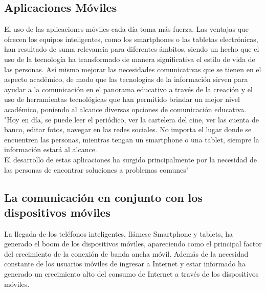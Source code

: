 	\subsection{Aplicaciones Móviles}
	
	El uso de las aplicaciones móviles cada día toma más fuerza. Las ventajas que ofrecen los equipos inteligentes, como los smartphones o las tabletas electrónicas, han resultado de suma relevancia para diferentes ámbitos, siendo un hecho que el uso de la tecnología ha transformado de manera significativa el estilo de vida de las personas. 
	Así mismo mejorar las necesidades comunicativas que se tienen en el aspecto académico, de modo que las tecnologías de la información sirven para ayudar a la comunicación en el panorama educativo a través de la creación y el uso de herramientas tecnológicas que han permitido brindar un mejor nivel académico, poniendo al alcance diversas opciones de comunicación educativa. \cite{06}\\
	
	"Hoy en día, se puede leer el periódico, ver la cartelera del cine, ver las cuenta de banco, editar fotos, navegar en las redes sociales. No importa el lugar donde se encuentren las personas, mientras tengan un smartphone o una tablet, siempre la información estará al alcance.\\
	El desarrollo de estas aplicaciones ha surgido principalmente por la necesidad de las personas de encontrar soluciones a problemas comunes" \cite{07}

	\subsection{La comunicación en conjunto con los dispositivos móviles}
	La llegada de los teléfonos inteligentes, llámese Smartphone y tablets, ha generado el boom de los dispositivos móviles, apareciendo como el principal factor del crecimiento de la conexión de banda ancha móvil. Además de la necesidad constante de los usuarios móviles de ingresar a Internet y estar informado ha generado un crecimiento alto del consumo de Internet a través de los dispositivos móviles. \cite{09}
